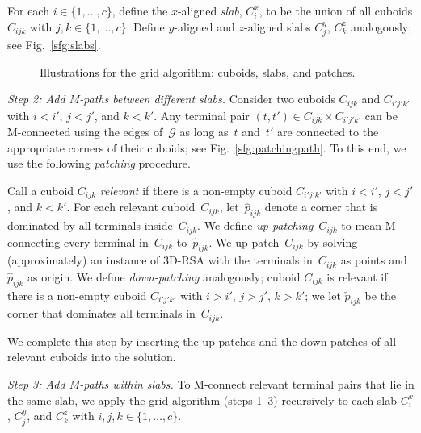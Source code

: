 \documentclass[11pt]{llncs}
\begin{document}
For each $i \in \{1,\dots,c\}$, define the $x$-aligned \emph{slab},
$C_i^x$, to be the union of all cuboids $C_{ijk}$ with $j,k \in
\{1,\dots,c\}$.  Define $y$-aligned and $z$-aligned
slabs $C_j^y$, $C_k^z$ analogously; see Fig.~\ref{sfg:slabs}.

\begin{figure}[h]
  \hfill
  \hfill
  \caption{Illustrations for the grid algorithm: cuboids, slabs, and patches.}
  \label{fig:alg3d}  
\end{figure}


\medskip
\noindent
{\em Step 2: Add M-paths between different slabs.} 
Consider two cuboids $C_{ijk}$ and $C_{i'j'k'}$ with $i<i'$, $j<j'$,
and $k<k'$.  Any terminal pair $(t,t') \in C_{ijk} \times C_{i'j'k'}$
can be M-connected using the edges of~$\mathcal G$ as long 
as~$t$ and~$t'$ are connected to the appropriate corners of their
cuboids; see Fig.~\ref{sfg:patchingpath}.  To this end, we use the
following \emph{patching} procedure. 

Call a cuboid $C_{ijk}$ \emph{relevant} if there is a non-empty cuboid
$C_{i'j'k'}$ with $i<i'$, $j<j'$, and $k<k'$.  For each relevant
cuboid~$C_{ijk}$, let~$\hat{p}_{ijk}$ denote a corner that is dominated by all
terminals inside~$C_{ijk}$.
We define \emph{up-patching}~$C_{ijk}$ to mean M-connecting every terminal
in~$C_{ijk}$ to~$\hat{p}_{ijk}$.  We up-patch~$C_{ijk}$ by solving 
(approximately) an instance of 3D-RSA with the terminals in~$C_{ijk}$
as points and $\hat{p}_{ijk}$ as origin.  We define \emph{down-patching}
analogously; cuboid $C_{ijk}$ is relevant if there is a non-empty
cuboid $C_{i'j'k'}$ with $i>i'$, $j>j'$, $k>k'$; we let $\check{p}_{ijk}$
be the corner that dominates all terminals in~$C_{ijk}$.

We complete this step by inserting the up-patches and the down-patches
of all relevant cuboids into the solution. 

\medskip
\noindent
{\em Step 3: Add M-paths within slabs.}  
To M-connect relevant terminal pairs that lie in the same slab, we
apply the grid algorithm (steps 1--3) recursively to each slab $C_i^x$,
$C_j^y$, and $C_k^z$ with $i,j,k \in \{1,\dots,c\}$.
\end{document}
